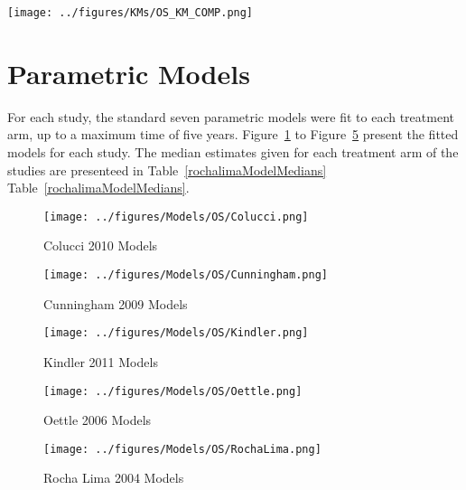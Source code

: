 \begin{sidewaysfigure}[ht]
    \centering
    \texttt{[image: ../figures/KMs/OS\_KM\_COMP.png]}
    \caption{OS Kaplan-Meier data for comparators}
    \label{fig:OSComp}
\end{sidewaysfigure}

\section{Parametric Models}

For each study, the standard seven parametric models were fit to each treatment arm, up to a maximum time of five years. Figure~\ref{collucimodels} to Figure~\ref{rlmodels} present the fitted models for each study. The median estimates given for each treatment arm of the studies are presenteed in Table~\ref{rochalimaModelMedians} \- Table~\ref{rochalimaModelMedians}.

\begin{figure}
    \texttt{[image: ../figures/Models/OS/Colucci.png]}
    \caption{Colucci 2010 Models}
    \label{collucimodels}
\end{figure}

\begin{figure}
    \texttt{[image: ../figures/Models/OS/Cunningham.png]}
    \caption{Cunningham 2009 Models}
    \label{cunnmodels}
\end{figure}

\begin{figure}
    \texttt{[image: ../figures/Models/OS/Kindler.png]}
    \caption{Kindler 2011 Models}
    \label{kinmodels}
\end{figure}

\begin{figure}
    \texttt{[image: ../figures/Models/OS/Oettle.png]}
    \caption{Oettle 2006 Models}
    \label{oettlemodels}
\end{figure}

\begin{figure}
    \texttt{[image: ../figures/Models/OS/RochaLima.png]}
    \caption{Rocha Lima 2004 Models}
    \label{rlmodels}
\end{figure}